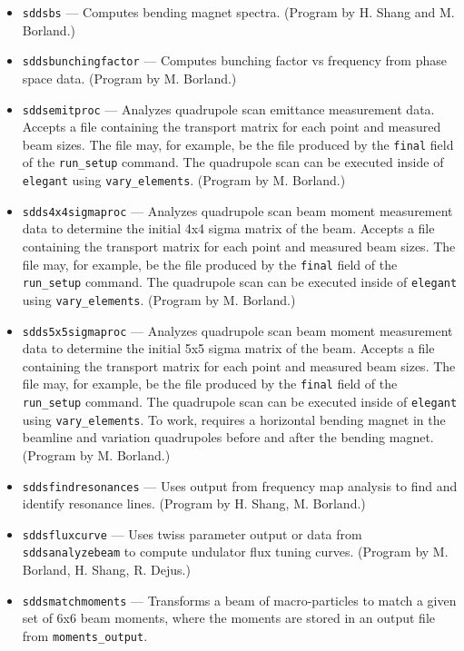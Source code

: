 \documentclass[11pt]{article}
\begin{document}
\begin{itemize}
  compute undulator brightness curves.  (Program by H. Shang, R. Dejus, R. Lindberg, M. Borland, X. Jiao.)
\item {\tt sddsbs} --- Computes bending magnet spectra.
  (Program by H. Shang and M. Borland.)
\item {\tt sddsbunchingfactor} --- Computes bunching factor vs frequency from phase space data.
  (Program by M. Borland.)
\item {\tt sddsemitproc} --- Analyzes quadrupole scan emittance measurement data.  Accepts a
        file containing the transport matrix for each point and measured beam sizes.  
        The file may, for example, be the file produced
        by the {\tt final} field of the {\tt run\_setup} command.  The quadrupole scan can be
        executed inside of {\tt elegant} using {\tt vary\_elements}. (Program by M. Borland.)
\item {\tt sdds4x4sigmaproc} --- Analyzes quadrupole scan beam moment measurement data to determine
  the initial 4x4 sigma matrix of the beam.  Accepts a
  file containing the transport matrix for each point and measured beam sizes.  
  The file may, for example, be the file produced
  by the {\tt final} field of the {\tt run\_setup} command.  The quadrupole scan can be
  executed inside of {\tt elegant} using {\tt vary\_elements}. (Program by M. Borland.)
\item {\tt sdds5x5sigmaproc} --- Analyzes quadrupole scan beam moment measurement data to determine
  the initial 5x5 sigma matrix of the beam.  Accepts a
  file containing the transport matrix for each point and measured beam sizes.  
  The file may, for example, be the file produced
  by the {\tt final} field of the {\tt run\_setup} command.  The quadrupole scan can be
  executed inside of {\tt elegant} using {\tt vary\_elements}. To work, requires a horizontal bending magnet
  in the beamline and variation quadrupoles before and after the bending magnet. (Program by M. Borland.)
\item {\tt sddsfindresonances} --- Uses output from frequency map analysis to find and identify resonance lines.
 (Program by H. Shang, M. Borland.)
\item {\tt sddsfluxcurve} --- Uses twiss parameter output or data from {\tt sddsanalyzebeam} to
  compute undulator flux tuning curves.  (Program by M. Borland, H. Shang, R. Dejus.)
\item {\tt sddsmatchmoments} --- Transforms a beam of macro-particles to match a given set of 
  6x6 beam moments, where the moments are stored in an output file from \verb|moments_output|.

\end{itemize}
\end{document}
